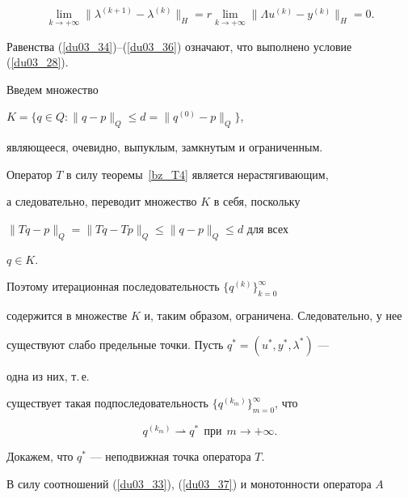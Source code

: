 \begin{pf}
\begin{equation}


\lim_{k \to+\infty} \| \lambda^{(k+1)} -\lambda^{(k)} \|_H =


r \lim_{k \to+\infty} \| \Lambda u^{(k)}-y^{(k)} \|_H=0 .


\label{du03_36}


\end{equation}





Равенства (\ref{du03_34})--(\ref{du03_36}) означают, что выполнено условие (\ref{du03_28}).





Введем множество


$ K=\{{q \in Q: \| {q-p} \|_Q \leq d=\| {q^{(0)}-p} \|_Q} \}$,


являющееся, очевидно, выпуклым, замкнутым и ограниченным.


Оператор $T$ в силу теоремы~\ref{bz_T4} является нерастягивающим,


а следовательно, переводит множество $K$ в себя, поскольку


$ \| {Tq{-}p} \|_Q=\| {Tq{-}T p} \|_Q \leq \| {q{-}p} \|_Q \leq d $ для всех


$q \in K$.


Поэтому итерационная последовательность $ \{{q^{(k)}} \}_{k=0} ^{\infty}$


содержится в множестве $K$ и, таким образом, ограничена. Следовательно, у нее


существуют слабо предельные точки. Пусть $q^*=(u^*,y^*,\lambda^*)$ --- 


одна из них, т.\,е. 


существует такая подпоследовательность $ \{{q^{(k_m)}} \}_{m=0} ^{\infty}$, что 


\begin{equation}


q^{(k_m)} \rightharpoonup q^* \ \ \text{при} \ \ m \to+\infty .


\label{du03_37}


\end{equation}





Докажем, что $q^*$ --- неподвижная точка оператора $T$.





В силу соотношений (\ref{du03_33}), (\ref{du03_37}) и монотонности оператора $A$



\end{pf}
